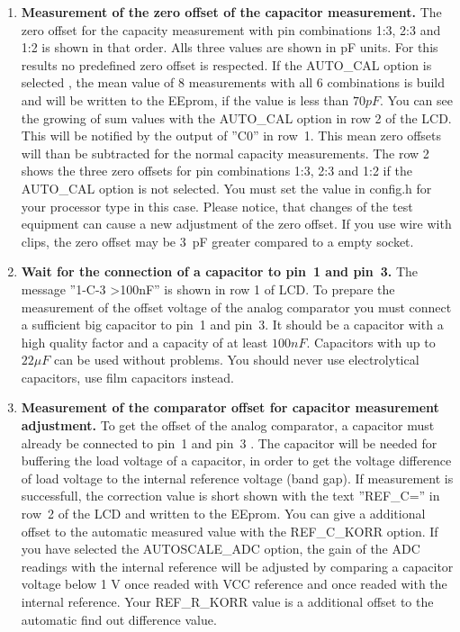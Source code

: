 \begin{enumerate}
\item {\bf Measurement of the zero offset of the capacitor measurement.}
The zero offset for the capacity measurement with pin combinations 1:3, 2:3 and 1:2 is shown in that order.
Alls three values are shown in pF units.
For this results no predefined zero offset is respected.
If the AUTO\_CAL option is selected , the mean value of 8 measurements with all 6 combinations is build and
will be written to the EEprom, if the value is less than \(70 pF\).
You can see the growing of sum values with the AUTO\_CAL option in row 2 of the LCD.
This will be notified by the output of ''C0'' in row~1.
This mean zero offsets will than be subtracted for the normal capacity measurements.
The row 2 shows the three zero offsets for pin combinations 1:3, 2:3 and 1:2 if
the AUTO\_CAL option is not selected. You must set the value in config.h for your
processor type in this case.
Please notice, that changes of the test equipment can cause a new adjustment of the zero offset.
If you use wire with clips, the zero offset may be 3~pF greater compared to a empty socket.

\item {\bf Wait for the connection of a capacitor to pin~1 and pin~3.}
The message ''1-C-3 \textgreater 100nF'' is shown in row 1 of LCD.
To prepare the measurement of the offset voltage of the analog comparator you must connect
a sufficient big capacitor to pin~1 and pin~3.
It should be a capacitor with a high quality factor and a capacity of at least  \(100 nF\).
Capacitors with up to \(22 \mu F\) can be used without problems.
You should never use electrolytical capacitors, use film capacitors instead.

\item {\bf Measurement of the comparator offset for capacitor measurement adjustment.}
To get the offset of the analog comparator, a capacitor must already be connected to pin~1 and pin~3 .
The capacitor will be needed for buffering the load voltage of a capacitor, in order to get the voltage
difference of load voltage to the internal reference voltage (band gap).
If measurement is successfull, the correction value is short shown with the text ''REF\_C='' in row~2 of 
the LCD and written to the EEprom. You can give a additional offset to the automatic measured value
with the REF\_C\_KORR option.
If you have selected the AUTOSCALE\_ADC option, the gain of the ADC readings with the internal reference
will be adjusted by comparing a capacitor voltage below 1 V once readed with VCC reference and once
readed with the internal reference. Your REF\_R\_KORR value is a additional offset to the automatic
find out difference value.

\end{enumerate}

